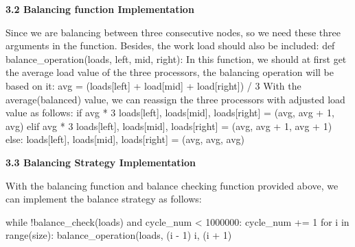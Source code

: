 \documentclass{article}%
\newenvironment{code}%
   {\snugshade\verbatim}%
   {\endverbatim\endsnugshade}
\begin{document}
\begin{Large}
\begin{LARGE}
\begin{flushleft}
\textbf{3.2 Balancing function Implementation}
\end{flushleft}
\end{LARGE}
Since we are balancing between three consecutive nodes, so we need these three arguments in the function. Besides, the work load should also be included:
\begin{code}
    def balance_operation(loads, left, mid, right):
\end{code}
In this function, we should at first get the average load value of the three processors, the balancing operation will be based on it:
\begin{code}
    avg = (loads[left] + load[mid] + load[right]) / 3
\end{code}
With the average(balanced) value, we can reassign the three processors with adjusted load value as follows:
\begin{code}
    if avg * 3 %
        loads[left], loads[mid], loads[right] = 
            (avg, avg + 1, avg)
    elif avg * 3 %
        loads[left], loads[mid], loads[right] = 
            (avg, avg + 1, avg + 1)
    else:
        loads[left], loads[mid], loads[right] = 
            (avg, avg, avg)
\end{code}
\begin{LARGE}
\begin{flushleft}
\textbf{3.3 Balancing Strategy Implementation}
\end{flushleft}
\end{LARGE}
With the balancing function and balance checking function provided above, we can implement the balance strategy as follows:
\newpage

\begin{code}
    while !balance_check(loads) and cycle_num < 1000000:
        cycle_num += 1
        for i in range(size):
            balance_operation(loads, (i - 1) %
                                  i, (i + 1) %
\end{code}


\end{Large}
\end{document}
